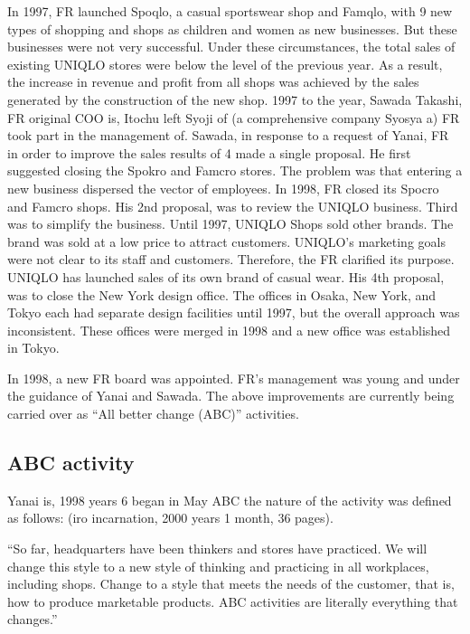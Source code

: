 \documentclass[12pt,a4paper]{article}
\begin{document}
In 1997, FR launched Spoqlo, a casual sportswear shop and Famqlo, with 9
new types of shopping and shops as children and women as new businesses.
But these businesses were not very successful. Under these
circumstances, the total sales of existing UNIQLO stores were below the
level of the previous year. As a result, the increase in revenue and
profit from all shops was achieved by the sales generated by the
construction of the new shop. 1997 to the year, Sawada Takashi, FR
original COO is, Itochu left Syoji of (a comprehensive company Syosya a)
FR took part in the management of. Sawada, in response to a request of
Yanai, FR in order to improve the sales results of 4 made a single
proposal. He first suggested closing the Spokro and Famcro stores. The
problem was that entering a new business dispersed the vector of
employees. In 1998, FR closed its Spocro and Famcro shops. His 2nd
proposal, was to review the UNIQLO business. Third was to simplify the
business. Until 1997, UNIQLO Shops sold other brands. The brand was sold
at a low price to attract customers. UNIQLO's marketing goals were not
clear to its staff and customers. Therefore, the FR clarified its
purpose. UNIQLO has launched sales of its own brand of casual wear. His
4th proposal, was to close the New York design office. The offices in
Osaka, New York, and Tokyo each had separate design facilities until
1997, but the overall approach was inconsistent. These offices were
merged in 1998 and a new office was established in Tokyo.

In 1998, a new FR board was appointed. FR's management was young and
under the guidance of Yanai and Sawada. The above improvements are
currently being carried over as ``All better change (ABC)'' activities.

\hypertarget{abc-activity}{%
\subsection{ABC activity}\label{abc-activity}}

Yanai is, 1998 years 6 began in May ABC the nature of the activity was
defined as follows: (iro incarnation, 2000 years 1 month, 36 pages).

``So far, headquarters have been thinkers and stores have practiced. We
will change this style to a new style of thinking and practicing in all
workplaces, including shops. Change to a style that meets the needs of
the customer, that is, how to produce marketable products. ABC
activities are literally everything that changes.''
\end{document}
